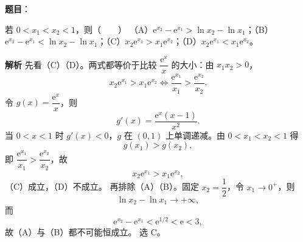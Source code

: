 \begin{answer}

\textbf{题目}：

若 $0<x_1<x_2<1$，则\mbox{（　　）}
（A）$\mathrm e^{x_2}-\mathrm e^{x_1}>\ln x_2-\ln x_1$；（B）$\mathrm e^{x_2}-\mathrm e^{x_1}<\ln x_2-\ln x_1$；（C）$x_2\mathrm e^{x_1}>x_1\mathrm e^{x_2}$；（D）$x_2\mathrm e^{x_1}<x_1\mathrm e^{x_2}$。

\textbf{解析}
先看（C）（D）。两式都等价于比较 $\dfrac{\mathrm e^x}{x}$ 的大小：由 $x_1x_2>0$，
\nopagebreak[4]
\[x_2\mathrm e^{x_1}>x_1\mathrm e^{x_2}\iff\frac{\mathrm e^{x_1}}{x_1}>\frac{\mathrm e^{x_2}}{x_2}.\]
令 $g(x)=\dfrac{\mathrm e^x}x$，则
\nopagebreak[4]
\[g'(x)=\frac{\mathrm e^x(x-1)}{x^2}.\]
当 $0<x<1$ 时 $g'(x)<0$，$g$ 在 $(0,1)$ 上单调递减。由 $0<x_1<x_2<1$ 得
\nopagebreak[4]
\[g(x_1)>g(x_2),\]
即 $\dfrac{\mathrm e^{x_1}}{x_1}>\dfrac{\mathrm e^{x_2}}{x_2}$，故
\nopagebreak[4]
\[x_2\mathrm e^{x_1}>x_1\mathrm e^{x_2},\]
（C）成立，（D）不成立。
再排除（A）（B）。固定 $x_2=\dfrac12$，令 $x_1\to0^+$，则
\nopagebreak[4]
\[\ln x_2-\ln x_1\to+\infty,\]
而
\nopagebreak[4]
\[\mathrm e^{x_2}-\mathrm e^{x_1}<\mathrm e^{1/2}<\mathrm e<3,\]
故（A）与（B）都不可能恒成立。
选 C。


\end{answer}
